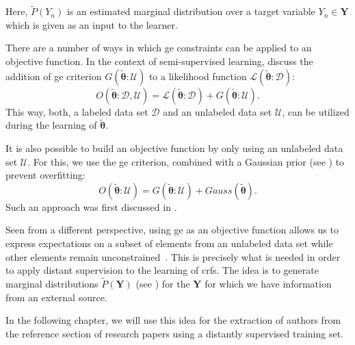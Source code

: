 Here, $\tilde{P}(Y_n)$ is an estimated \gls{marginal distribution} over a \gls{target variable} $Y_n\in\mathbf{Y}$ which is given as an input to the learner.

\bigskip

There are a number of ways in which \gls{ge} constraints can be applied to an \gls{objective function}.
In the context of semi-supervised learning, \citet{mann2010generalized} discuss the addition of \gls{ge} criterion $G(\bm{\tilde{\theta}}:\mathcal{U})$ to a likelihood function $\mathcal{L}(\bm{\tilde{\theta}}:\mathcal{D})$:
\begin{equation}
  \label{equ:objective-function-l-g}
  O(\bm{\tilde{\theta}}:\mathcal{D},\mathcal{U})=\mathcal{L}(\bm{\tilde{\theta}}:\mathcal{D})+G(\bm{\tilde{\theta}}:\mathcal{U}).
\end{equation}
This way, both, a labeled data set $\mathcal{D}$ and an unlabeled data set $\mathcal{U}$, can be utilized during the learning of $\bm{\tilde{\theta}}$.

It is also possible to build an \gls{objective function} by only using an unlabeled data set $\mathcal{U}$.
For this, we use the \gls{ge} criterion, combined with a Gaussian prior (see ) to prevent overfitting:
\begin{equation}
  \label{equ:objective-function-g}
  O(\bm{\tilde{\theta}}:\mathcal{U})=G(\bm{\tilde{\theta}}:\mathcal{U})+Gauss(\bm{\tilde{\theta}}).
\end{equation}
Such an approach was first discussed in \citet{mann2008generalized}.

Seen from a different perspective, using \gls{ge} as an objective function allows us to express expectations on a subset of elements from an unlabeled data set while other elements remain unconstrained~\citep{mann2010generalized}.
This is precisely what is needed in order to apply \gls{distant supervision} to the learning of \glspl{crf}.
The idea is to generate \glspl{marginal distribution} $\tilde{P}(\mathbf{Y})$ (see ) for the $\mathbf{Y}$ for which we have information from an external source.

In the following chapter, we will use this idea for the extraction of authors from the reference section of research papers using a distantly supervised training set.

